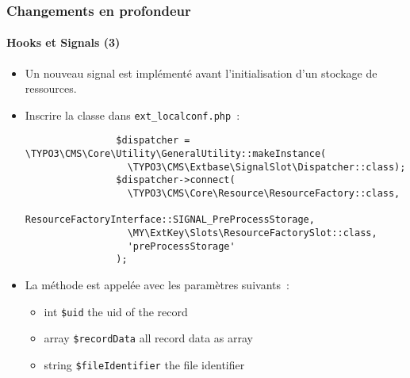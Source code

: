 \begin{frame}[fragile]
	\frametitle{Changements en profondeur}
	\framesubtitle{Hooks et Signals (3)}

	\lstset{basicstyle=\tiny\ttfamily}

	\begin{itemize}

		\item Un nouveau signal est implémenté avant l'initialisation d'un stockage de ressources.

		\item Inscrire la classe dans \texttt{ext\_localconf.php}~:

			\begin{lstlisting}
				$dispatcher = \TYPO3\CMS\Core\Utility\GeneralUtility::makeInstance(
				  \TYPO3\CMS\Extbase\SignalSlot\Dispatcher::class);
				$dispatcher->connect(
				  \TYPO3\CMS\Core\Resource\ResourceFactory::class,
				  ResourceFactoryInterface::SIGNAL_PreProcessStorage,
				  \MY\ExtKey\Slots\ResourceFactorySlot::class,
				  'preProcessStorage'
				);
			\end{lstlisting}

		\item La méthode est appelée avec les paramètres suivants~:

			\begin{itemize}
				\item int \texttt{\$uid} the uid of the record
				\item array \texttt{\$recordData} all record data as array
				\item string \texttt{\$fileIdentifier} the file identifier
			\end{itemize}

	\end{itemize}

\end{frame}

